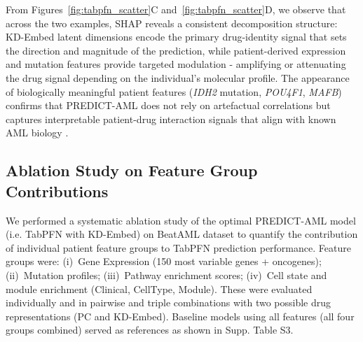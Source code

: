 \documentclass[pdflatex,sn-mathphys-num]{sn-jnl}
\theoremstyle{thmstyleone}
\theoremstyle{thmstyletwo}
\theoremstyle{thmstylethree}
\begin{document}

From Figures~\ref{fig:tabpfn_scatter}C and~\ref{fig:tabpfn_scatter}D, we observe that across the two examples, SHAP reveals a consistent decomposition structure: KD-Embed latent dimensions encode the primary drug-identity signal that sets the direction and magnitude of the prediction, while patient-derived expression and mutation features provide targeted modulation - amplifying or attenuating the drug signal depending on the individual's molecular profile. The appearance of biologically meaningful patient features (\textit{IDH2} mutation, \textit{POU4F1}, \textit{MAFB}) confirms that PREDICT-AML does not rely on artefactual correlations but captures interpretable patient-drug interaction signals that align with known AML biology \cite{bisaillon2020genetic, diamantidis2025factors, ventura2025mafb}.
\subsection{Ablation Study on Feature Group Contributions}\label{sec3.4}
We performed a systematic ablation study of the optimal PREDICT-AML model (i.e. TabPFN with KD-Embed) on BeatAML dataset to quantify the contribution of individual patient feature groups to TabPFN prediction performance. Feature groups were: (i)~Gene Expression (150 most variable genes + oncogenes); (ii)~Mutation profiles; (iii)~Pathway enrichment scores; (iv)~Cell state and module enrichment (Clinical, CellType, Module). These were evaluated individually and in pairwise and triple combinations with two possible drug representations (PC and KD-Embed). Baseline models using all features (all four groups combined) served as references as shown in Supp. Table S3.
\end{document}
